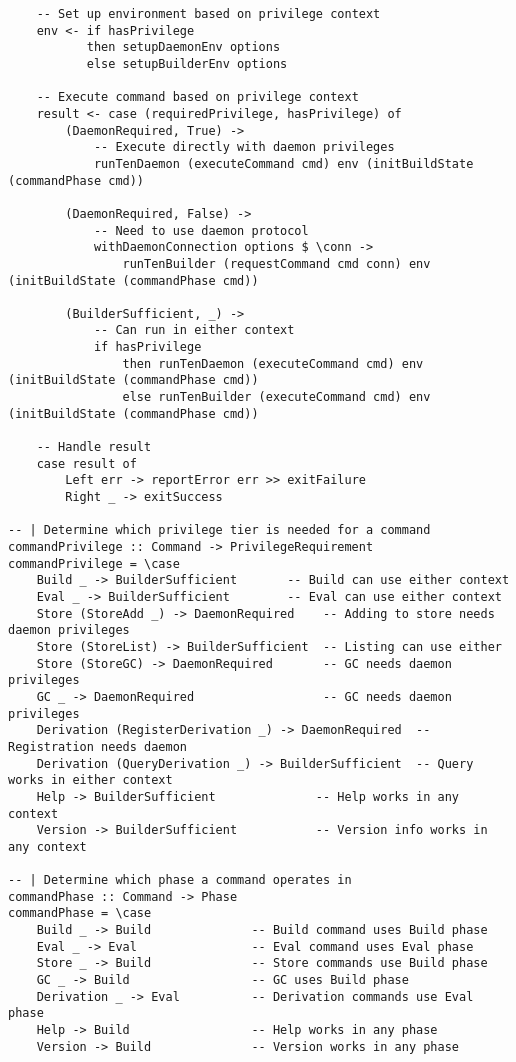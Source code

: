 \documentclass{article}
\begin{document}
\begin{tcolorbox}[title=Ten/CLI.hs Changes]
\begin{verbatim}
    -- Set up environment based on privilege context
    env <- if hasPrivilege
           then setupDaemonEnv options
           else setupBuilderEnv options

    -- Execute command based on privilege context
    result <- case (requiredPrivilege, hasPrivilege) of
        (DaemonRequired, True) ->
            -- Execute directly with daemon privileges
            runTenDaemon (executeCommand cmd) env (initBuildState (commandPhase cmd))

        (DaemonRequired, False) ->
            -- Need to use daemon protocol
            withDaemonConnection options $ \conn ->
                runTenBuilder (requestCommand cmd conn) env (initBuildState (commandPhase cmd))

        (BuilderSufficient, _) ->
            -- Can run in either context
            if hasPrivilege
                then runTenDaemon (executeCommand cmd) env (initBuildState (commandPhase cmd))
                else runTenBuilder (executeCommand cmd) env (initBuildState (commandPhase cmd))

    -- Handle result
    case result of
        Left err -> reportError err >> exitFailure
        Right _ -> exitSuccess

-- | Determine which privilege tier is needed for a command
commandPrivilege :: Command -> PrivilegeRequirement
commandPrivilege = \case
    Build _ -> BuilderSufficient       -- Build can use either context
    Eval _ -> BuilderSufficient        -- Eval can use either context
    Store (StoreAdd _) -> DaemonRequired    -- Adding to store needs daemon privileges
    Store (StoreList) -> BuilderSufficient  -- Listing can use either
    Store (StoreGC) -> DaemonRequired       -- GC needs daemon privileges
    GC _ -> DaemonRequired                  -- GC needs daemon privileges
    Derivation (RegisterDerivation _) -> DaemonRequired  -- Registration needs daemon
    Derivation (QueryDerivation _) -> BuilderSufficient  -- Query works in either context
    Help -> BuilderSufficient              -- Help works in any context
    Version -> BuilderSufficient           -- Version info works in any context

-- | Determine which phase a command operates in
commandPhase :: Command -> Phase
commandPhase = \case
    Build _ -> Build              -- Build command uses Build phase
    Eval _ -> Eval                -- Eval command uses Eval phase
    Store _ -> Build              -- Store commands use Build phase
    GC _ -> Build                 -- GC uses Build phase
    Derivation _ -> Eval          -- Derivation commands use Eval phase
    Help -> Build                 -- Help works in any phase
    Version -> Build              -- Version works in any phase


\end{verbatim}
\end{tcolorbox}
\end{document}
